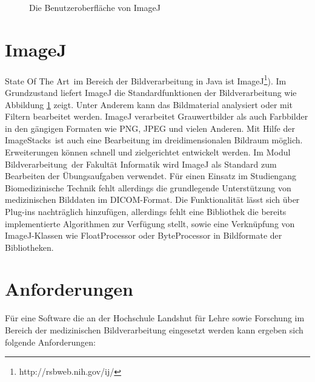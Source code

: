 \begin{figure}[htbp]
  \vspace{0.5cm}
  \centering
  \caption{Die Benutzeroberfläche von ImageJ}
  \label{imagej}
  \vspace{0.5cm}
\end{figure}

\section{ImageJ}

\glqq State Of The Art\grqq\ im Bereich der Bildverarbeitung in Java ist ImageJ\footnote{http://rsbweb.nih.gov/ij/}). Im Grundzustand liefert ImageJ die Standardfunktionen der Bildverarbeitung wie Abbildung \ref{imagej} zeigt. Unter Anderem kann das Bildmaterial analysiert oder mit Filtern bearbeitet werden. ImageJ verarbeitet Grauwertbilder als auch Farbbilder in den gängigen Formaten wie PNG, JPEG und vielen Anderen. Mit Hilfe der \glqq ImageStacks\grqq\ ist auch eine Bearbeitung im dreidimensionalen Bildraum möglich. Erweiterungen können schnell und zielgerichtet entwickelt werden. Im Modul \glqq Bildverarbeitung\grqq\ der Fakultät Informatik wird ImageJ als Standard zum Bearbeiten der Übungsaufgaben verwendet. Für einen Einsatz im Studiengang Biomedizinische Technik fehlt allerdings die grundlegende Unterstützung von medizinischen Bilddaten im DICOM-Format. Die Funktionalität lässt sich über Plug-ins nachträglich hinzufügen, allerdings fehlt eine Bibliothek die bereits implementierte Algorithmen zur Verfügung stellt, sowie eine Verknüpfung von ImageJ-Klassen wie FloatProcessor oder ByteProcessor in Bildformate der Bibliotheken.

\section{Anforderungen}

Für eine Software die an der Hochschule Landshut für Lehre sowie Forschung im Bereich der medizinischen Bildverarbeitung eingesetzt werden kann ergeben sich folgende Anforderungen:

